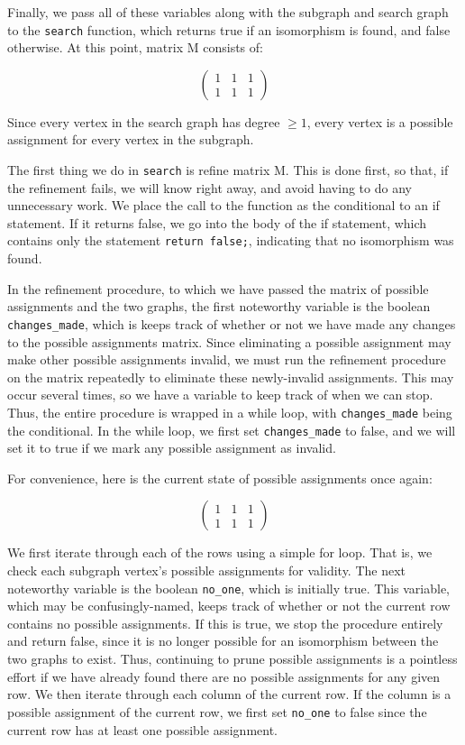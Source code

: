 \documentclass{article}
\begin{document}
  Finally, we pass all of these variables along with the subgraph and search graph to the \texttt{search} function, which returns true if an isomorphism is found, and false otherwise. At this point, matrix M consists of:
  
  \[ \begin{pmatrix}
      1 & 1 & 1 \\
      1 & 1 & 1
  \end{pmatrix} \]

  Since every vertex in the search graph has degree $\geq 1$, every vertex is a possible assignment for every vertex in the subgraph.

  The first thing we do in \texttt{search} is refine matrix M. This is done first, so that, if the refinement fails, we will know right away, and avoid having to do any unnecessary work. We place the call to the function as the conditional to an if statement. If it returns false, we go into the body of the if statement, which contains only the statement \texttt{return false;}, indicating that no isomorphism was found.

  In the refinement procedure, to which we have passed the matrix of possible assignments and the two graphs, the first noteworthy variable is the boolean \texttt{changes\_made}, which is keeps track of whether or not we have made any changes to the possible assignments matrix. Since eliminating a possible assignment may make other possible assignments invalid, we must run the refinement procedure on the matrix repeatedly to eliminate these newly-invalid assignments. This may occur several times, so we have a variable to keep track of when we can stop. Thus, the entire procedure is wrapped in a while loop, with \texttt{changes\_made} being the conditional. In the while loop, we first set \texttt{changes\_made} to false, and we will set it to true if we mark any possible assignment as invalid.

  For convenience, here is the current state of possible assignments once again:

  \[ \begin{pmatrix}
      1 & 1 & 1 \\
      1 & 1 & 1
  \end{pmatrix} \]

  We first iterate through each of the rows using a simple for loop. That is, we check each subgraph vertex's possible assignments for validity. The next noteworthy variable is the boolean \texttt{no\_one}, which is initially true. This variable, which may be confusingly-named, keeps track of whether or not the current row contains no possible assignments. If this is true, we stop the procedure entirely and return false, since it is no longer possible for an isomorphism between the two graphs to exist. Thus, continuing to prune possible assignments is a pointless effort if we have already found there are no possible assignments for any given row. We then iterate through each column of the current row. If the column is a possible assignment of the current row, we first set \texttt{no\_one} to false since the current row has at least one possible assignment.
\end{document}
